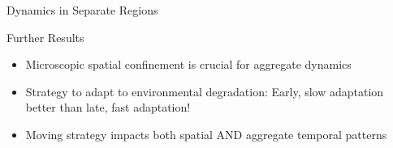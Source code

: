 



\begin{frame}{Dynamics in Separate Regions}
\centering
{}

\end{frame}

\begin{frame}{Further Results}
\centering
\begin{itemize}
\pause\item Microscopic spatial confinement is crucial for aggregate dynamics
\pause\item Strategy to adapt to environmental degradation: Early, slow adaptation better than late, fast adaptation! %
\pause\item Moving strategy impacts both spatial AND aggregate temporal patterns
\end{itemize}
\end{frame}
